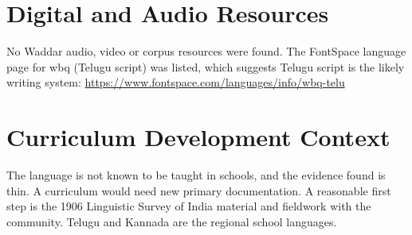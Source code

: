 \documentclass[12pt]{article}
\begin{document}
\section{Digital and Audio Resources}
No Waddar audio, video or corpus resources were found. The FontSpace language page for wbq (Telugu script) was listed, which suggests Telugu script is the likely writing system: \url{https://www.fontspace.com/languages/info/wbq-telu}

\section{Curriculum Development Context}
The language is not known to be taught in schools, and the evidence found is thin. A curriculum would need new primary documentation. A reasonable first step is the 1906 Linguistic Survey of India material and fieldwork with the community. Telugu and Kannada are the regional school languages.
\end{document}
